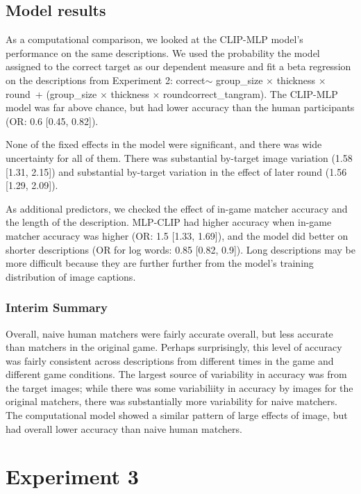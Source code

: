 \documentclass[10pt, letterpaper]{article}
\begin{document}
\subsection{Model results}\label{model-results}

As a computational comparison, we looked at the CLIP-MLP model's
performance on the same descriptions. We used the probability the model
assigned to the correct target as our dependent measure and fit a beta
regression on the descriptions from Experiment 2: correct\(\sim\)
group\_size \(\times\) thickness \(\times\) round~+ (group\_size
\(\times\) thickness \(\times\) round\textbar correct\_tangram). The
CLIP-MLP model was far above chance, but had lower accuracy than the
human participants (OR: 0.6 {[}0.45, 0.82{]}).

None of the fixed effects in the model were significant, and there was
wide uncertainty for all of them. There was substantial by-target image
variation (1.58 {[}1.31, 2.15{]}) and substantial by-target variation in
the effect of later round (1.56 {[}1.29, 2.09{]}).

As additional predictors, we checked the effect of in-game matcher
accuracy and the length of the description. MLP-CLIP had higher accuracy
when in-game matcher accuracy was higher (OR: 1.5 {[}1.33, 1.69{]}), and
the model did better on shorter descriptions (OR for log words: 0.85
{[}0.82, 0.9{]}). Long descriptions may be more difficult because they
are further further from the model's training distribution of image
captions.

\subsubsection{Interim Summary}\label{interim-summary}

Overall, naive human matchers were fairly accurate overall, but less
accurate than matchers in the original game. Perhaps surprisingly, this
level of accuracy was fairly consistent across descriptions from
different times in the game and different game conditions. The largest
source of variability in accuracy was from the target images; while
there was some variabiliity in accuracy by images for the original
matchers, there was substantially more variability for naive matchers.
The computational model showed a similar pattern of large effects of
image, but had overall lower accuracy than naive human matchers.

\section{Experiment 3}\label{experiment-3}
\end{document}

